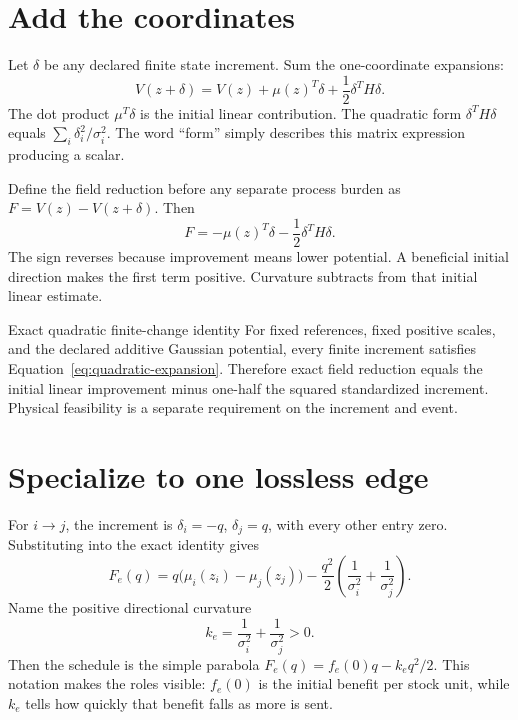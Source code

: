 \section{Add the coordinates}
Let \(\delta\) be any declared finite state increment. Sum the one-coordinate expansions:
\begin{equation}\label{eq:quadratic-expansion}
 V(z+\delta)=V(z)+\mu(z)^T\delta+\frac12\delta^TH\delta.
\end{equation}
The dot product \(\mu^T\delta\) is the initial linear contribution. The quadratic form \(\delta^TH\delta\) equals \(\sum_i\delta_i^2/\sigma_i^2\). The word ``form'' simply describes this matrix expression producing a scalar.

Define the field reduction before any separate process burden as \(F=V(z)-V(z+\delta)\). Then
\begin{equation}\label{eq:quadratic-field-reduction}
 F=-\mu(z)^T\delta-\frac12\delta^TH\delta.
\end{equation}
The sign reverses because improvement means lower potential. A beneficial initial direction makes the first term positive. Curvature subtracts from that initial linear estimate.

\begin{lawbox}{Exact quadratic finite-change identity}
For fixed references, fixed positive scales, and the declared additive Gaussian potential, every finite increment satisfies Equation~\ref{eq:quadratic-expansion}. Therefore exact field reduction equals the initial linear improvement minus one-half the squared standardized increment. Physical feasibility is a separate requirement on the increment and event.
\end{lawbox}

\section{Specialize to one lossless edge}
For \(i\to j\), the increment is \(\delta_i=-q\), \(\delta_j=q\), with every other entry zero. Substituting into the exact identity gives
\begin{equation}\label{eq:finite-lossless-field}
 F_e(q)=q\bigl(\mu_i(z_i)-\mu_j(z_j)\bigr)
       -\frac{q^2}{2}\left(\frac1{\sigma_i^2}+\frac1{\sigma_j^2}\right).
\end{equation}
Name the positive directional curvature
\begin{equation}
 k_e=\frac1{\sigma_i^2}+\frac1{\sigma_j^2}>0.
\end{equation}
Then the schedule is the simple parabola \(F_e(q)=f_e(0)q-k_eq^2/2\). This notation makes the roles visible: \(f_e(0)\) is the initial benefit per stock unit, while \(k_e\) tells how quickly that benefit falls as more is sent.

